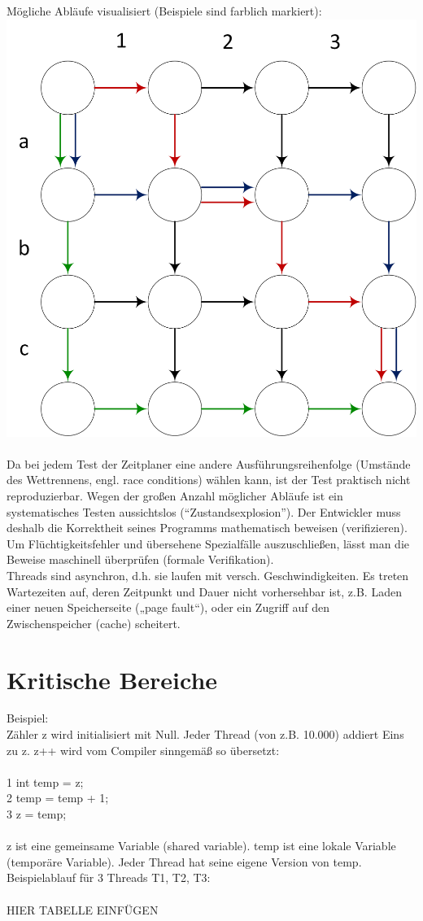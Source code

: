 Mögliche Abläufe visualisiert (Beispiele sind farblich markiert):\\
\includegraphics[width=.4\textwidth]{Nondeterminism}\\
\\
Da bei jedem Test der Zeitplaner eine andere Ausführungsreihenfolge (Umstände des Wettrennens, engl. race conditions) wählen kann, ist der Test praktisch nicht reproduzierbar. Wegen der großen Anzahl möglicher Abläufe ist ein systematisches Testen aussichtslos ("`Zustandsexplosion"').
Der Entwickler muss deshalb die Korrektheit seines Programms mathematisch beweisen (verifizieren). Um Flüchtigkeitsfehler und übersehene Spezialfälle auszuschließen, lässt man die Beweise maschinell überprüfen (formale Verifikation).
\\
Threads sind asynchron, d.h. sie laufen mit versch. Geschwindigkeiten. Es treten Wartezeiten auf, deren Zeitpunkt und Dauer nicht vorhersehbar ist, z.B. Laden einer neuen Speicherseite („page fault“), oder ein Zugriff auf den Zwischenspeicher (cache) scheitert.

\section{Kritische Bereiche}
Beispiel:\\
Zähler z wird initialisiert mit Null. Jeder Thread (von z.B. 10.000) addiert Eins zu z. z++ wird vom Compiler sinngemäß so übersetzt:\\
\\
1 int temp = z; \\
2 temp = temp + 1; \\
3 z = temp; \\
\\
z ist eine gemeinsame Variable (shared variable). temp ist eine lokale Variable (temporäre Variable).
Jeder Thread hat seine eigene Version von temp.\\
Beispielablauf für 3 Threads T1, T2, T3:\\
\\
HIER TABELLE EINFÜGEN

